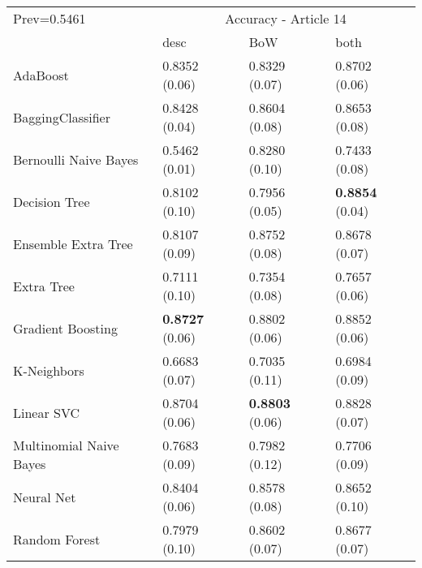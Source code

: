 \begin{tabular}{|l|l|l|l| }
\hline
Prev=0.5461 &  \multicolumn{3}{c|}{Accuracy - Article 14} \\
\cline{2-4} & desc & BoW & both \\ \hline
AdaBoost                & 0.8352 (0.06) & 0.8329 (0.07) & 0.8702 (0.06)\\
BaggingClassifier       & 0.8428 (0.04) & 0.8604 (0.08) & 0.8653 (0.08)\\
Bernoulli Naive Bayes   & 0.5462 (0.01) & 0.8280 (0.10) & 0.7433 (0.08)\\
Decision Tree           & 0.8102 (0.10) & 0.7956 (0.05) & {\bf 0.8854} (0.04)\\
Ensemble Extra Tree     & 0.8107 (0.09) & 0.8752 (0.08) & 0.8678 (0.07)\\
Extra Tree              & 0.7111 (0.10) & 0.7354 (0.08) & 0.7657 (0.06)\\
Gradient Boosting       & {\bf 0.8727} (0.06) & 0.8802 (0.06) & 0.8852 (0.06)\\
K-Neighbors             & 0.6683 (0.07) & 0.7035 (0.11) & 0.6984 (0.09)\\
Linear SVC              & 0.8704 (0.06) & {\bf 0.8803} (0.06) & 0.8828 (0.07)\\
Multinomial Naive Bayes & 0.7683 (0.09) & 0.7982 (0.12) & 0.7706 (0.09)\\
Neural Net              & 0.8404 (0.06) & 0.8578 (0.08) & 0.8652 (0.10)\\
Random Forest           & 0.7979 (0.10) & 0.8602 (0.07) & 0.8677 (0.07)\\
\hline
\end{tabular}